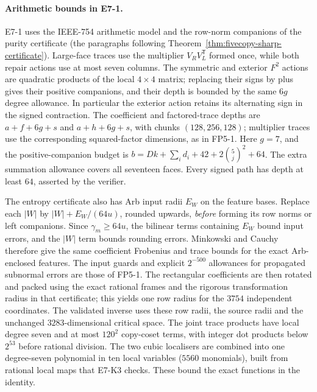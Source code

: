 \paragraph{Arithmetic bounds in E7-1.}
E7-1 uses the IEEE-754 arithmetic model and the row-norm companions
of the purity certificate (the paragraphs following
Theorem~\ref{thm:fivecopy-sharp-certificate}). Large-face traces use the
multiplier $V_RV_L^{\mathsf T}$ formed once, while both repair actions
use at most seven columns. The symmetric and exterior $F^2$ actions
are quadratic products of the local $4\times4$ matrix; replacing their
signs by plus gives their positive companions, and their depth is bounded
by the same $6g$ degree allowance. In particular the exterior action
retains its alternating sign in the signed contraction.
The coefficient and factored-trace depths are $a+f+6g+s$ and
$a+h+6g+s$, with chunks $(128,256,128)$; multiplier traces use the
corresponding squared-factor dimensions, as in FP5-1.
Here $g=7$, and the positive-companion budget is
$b=Dk+\sum_i d_i+42+2\binom5j^2+64$.
The extra summation allowance covers all seventeen faces. Every signed
path has depth at least $64$, asserted by the verifier.

The entropy certificate also has Arb input radii $E_W$ on the feature
bases. Replace each $|W|$ by $|W|+E_W/(64u)$, rounded upwards,
\emph{before} forming its row norms or left companions.
Since $\gamma_m\ge64u$, the bilinear terms containing $E_W$ bound
input errors, and the $|W|$ term bounds rounding errors. Minkowski and
Cauchy therefore give the same coefficient Frobenius and trace bounds
for the exact Arb-enclosed features. The input guards and explicit
$2^{-500}$ allowances for propagated subnormal errors are those of
FP5-1. The rectangular coefficients are then rotated and packed using
the exact rational frames and the rigorous transformation radius in
that certificate; this yields one row radius for the $3754$ independent
coordinates. The validated inverse uses these row radii, the source
radii and the unchanged $3283$-dimensional critical space.
The joint trace products have local degree seven and at
most $120^2$ copy-coset terms, with integer dot products below $2^{53}$ before rational division. The two
cubic localisers are combined into one degree-seven polynomial in ten local variables ($5560$ monomials),
built from rational local maps that E7-K3 checks. These bound the exact functions in the identity.

